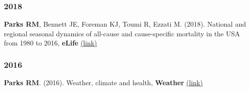 \subsubsection*{2018}

\noindent \textbf{Parks RM}, Bennett JE, Foreman KJ, Toumi R, Ezzati M. (2018). National and regional seasonal dynamics of all-cause and cause-specific mortality in the USA from 1980 to 2016, \textbf{eLife}  \href{https://doi.org/10.7554/eLife.35500}{(link)} \smallskip

\subsubsection*{2016}

\noindent \textbf{Parks RM}. (2016). Weather, climate and health, \textbf{Weather} \href{https://doi.org/10.1002/wea.2752}{(link)} \smallskip

